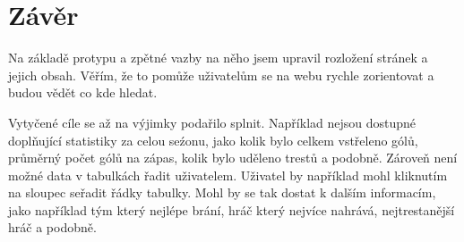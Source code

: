 \documentclass[11pt, a4paper, titlepage]{article}
\begin{document}
\section{Závěr}

Na základě protypu a zpětné vazby na něho jsem upravil rozložení stránek a jejich obsah. Věřím, že to pomůže uživatelům se na webu rychle zorientovat a budou vědět co kde hledat.

Vytyčené cíle se až na výjimky podařilo splnit. Například nejsou dostupné doplňující statistiky za celou seźonu, jako kolik bylo celkem vstřeleno gólů, průměrný počet gólů na zápas, kolik bylo uděleno trestů a podobně. Zároveň není možné data v tabulkách řadit uživatelem. Uživatel by například mohl kliknutím na sloupec seřadit řádky tabulky. Mohl by se tak dostat k dalším informacím, jako například tým který nejlépe brání, hráč který nejvíce nahrává, nejtrestanější hráč a podobně.

\end{document}
